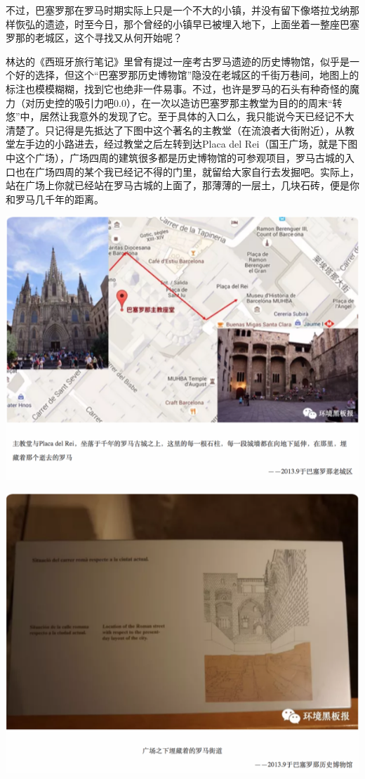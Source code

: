 \documentclass[
]{book}
\begin{document}
不过，巴塞罗那在罗马时期实际上只是一个不大的小镇，并没有留下像塔拉戈纳那样恢弘的遗迹，时至今日，那个曾经的小镇早已被埋入地下，上面坐着一整座巴塞罗那的老城区，这个寻找又从何开始呢？

林达的《西班牙旅行笔记》里曾有提过一座考古罗马遗迹的历史博物馆，似乎是一个好的选择，但这个``巴塞罗那历史博物馆''隐没在老城区的千街万巷间，地图上的标注也模模糊糊，找到它也绝非一件易事。不过，也许是罗马的石头有种奇怪的魔力（对历史控的吸引力吧0.0），在一次以造访巴塞罗那主教堂为目的的周末``转悠''中，居然让我意外的发现了它。至于具体的入口么，我只能说今天已经记不大清楚了。只记得是先抵达了下图中这个著名的主教堂（在流浪者大街附近），从教堂左手边的小路进去，经过教堂之后左转到达Placa del Rei（国王广场，就是下图中这个广场），广场四周的建筑很多都是历史博物馆的可参观项目，罗马古城的入口也在广场四周的某个我已经记不得的门里，就留给大家自行去发掘吧。实际上，站在广场上你就已经站在罗马古城的上面了，那薄薄的一层土，几块石砖，便是你和罗马几千年的距离。

\includegraphics[width=8.33in]{images/xt13}

\includegraphics[width=8.33in]{images/xt14}
\end{document}
